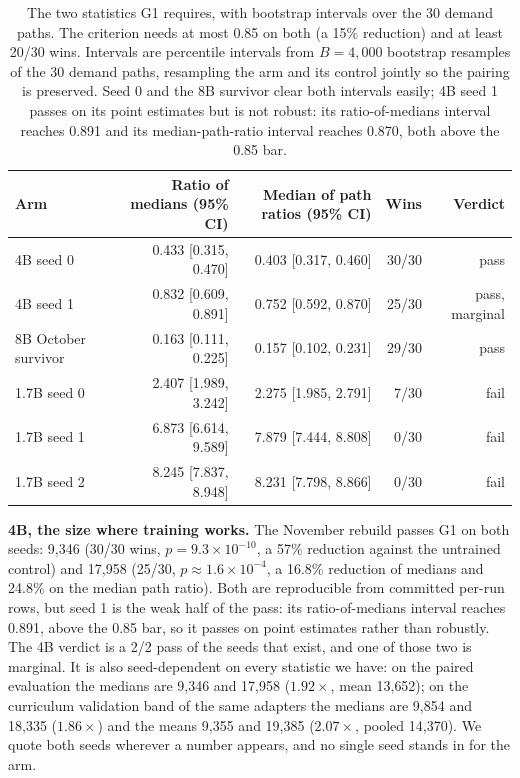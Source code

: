 \documentclass[11pt]{article}
\begin{document}
\begin{table}[ht]
\centering
\caption{The two statistics G1 requires, with bootstrap intervals over the 30 demand paths. The
criterion needs at most 0.85 on both (a 15\% reduction) and at least 20/30 wins. Intervals are
percentile intervals from $B=4{,}000$ bootstrap resamples of the 30 demand paths, resampling the arm and
its control jointly so the pairing is preserved. Seed 0 and the 8B survivor clear both intervals easily;
4B seed 1 passes on its point estimates but is not robust: its ratio-of-medians interval reaches 0.891
and its median-path-ratio interval reaches 0.870, both above the 0.85 bar.}
\label{tab:g1}
\small
\begin{tabular}{@{}lrrrr@{}}
\toprule
Arm & Ratio of medians (95\% CI) & Median of path ratios (95\% CI) & Wins & Verdict \\
\midrule
4B seed 0 & 0.433 [0.315, 0.470] & 0.403 [0.317, 0.460] & 30/30 & pass \\
4B seed 1 & 0.832 [0.609, 0.891] & 0.752 [0.592, 0.870] & 25/30 & pass, marginal \\
8B October survivor & 0.163 [0.111, 0.225] & 0.157 [0.102, 0.231] & 29/30 & pass \\
1.7B seed 0 & 2.407 [1.989, 3.242] & 2.275 [1.985, 2.791] & 7/30 & fail \\
1.7B seed 1 & 6.873 [6.614, 9.589] & 7.879 [7.444, 8.808] & 0/30 & fail \\
1.7B seed 2 & 8.245 [7.837, 8.948] & 8.231 [7.798, 8.866] & 0/30 & fail \\
\bottomrule
\end{tabular}
\end{table}

\textbf{4B, the size where training works.} The November rebuild passes G1 on both seeds: 9{,}346
(30/30 wins, $p = 9.3\times10^{-10}$, a 57\% reduction against the untrained control) and 17{,}958
(25/30, $p \approx 1.6\times10^{-4}$, a 16.8\% reduction of medians and 24.8\% on the median path
ratio). Both are reproducible from committed per-run rows, but seed 1 is the weak half of the pass: its
ratio-of-medians interval reaches 0.891, above the 0.85 bar, so it passes on point estimates rather
than robustly. The 4B verdict is a 2/2 pass of the seeds that exist, and one of those two is marginal. It is also seed-dependent on every statistic we have: on the paired evaluation the
medians are 9{,}346 and 17{,}958 ($1.92\times$, mean 13{,}652); on the curriculum validation band of
the same adapters the medians are 9{,}854 and 18{,}335 ($1.86\times$) and the means 9{,}355 and
19{,}385 ($2.07\times$, pooled 14{,}370). We quote both seeds wherever a number appears, and no single
seed stands in for the arm.
\end{document}
